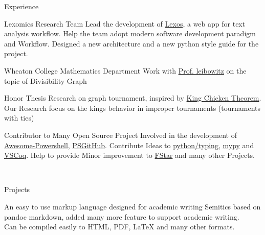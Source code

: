 \documentclass[]{resume-knyte}
\begin{document}
\begin{topic}{Experience}


    {Lexomics Research Team}
    {Lead the development of \href{https://github.com/WheatonCS/Lexos}{Lexos}, a web app for text analysis workflow.
    Help the team adopt modern software development paradigm and Workflow.
    Designed a new architecture and a new python style guide for the project.}

    {Wheaton College Mathematics Department}
    {Work with \href{https://wheatoncollege.edu/academics/faculty-directory/rochelle-shelly-leibowitz/}{Prof. leibowitz}
    on the topic of Divisibility Graph}

    {Honor Thesis}
    {Research on graph tournament, inspired by \href{https://www.maa.org/sites/default/files/pdf/upload_library/22/Allendoerfer/1981/0025570x.di021114.02p00982.pdf}{King Chicken Theorem}.
    Our Research focus on the kings behavior in improper tournaments (tournaments with ties)}


    {Contributor to Many Open Source Project}
    {Involved in the development of \href{https://github.com/janikvonrotz/awesome-powershell}{Awesome-Powershell}, \href{https://github.com/pcgeek86/PSGitHub}{PSGitHub}.
    Contribute Ideas to \href{https://github.com/python/typing}{python/typing}, \href{https://github.com/python/mypy}{mypy} and \href{https://github.com/siegebell/vscoq}{VSCoq}.
    Help to provide Minor improvement to \href{https://github.com/FStarLang/FStar}{FStar} and many other Projects.}

\\ %
\end{topic}



\begin{topic}{Projects}


    {An easy to use markup language designed for academic writing}
    {Semitics based on pandoc markdown, added many more feature to support academic writing.\\
    Can be compiled easily to HTML, PDF, \LaTeX{} and many other formats.}

\end{topic}
\end{document}
